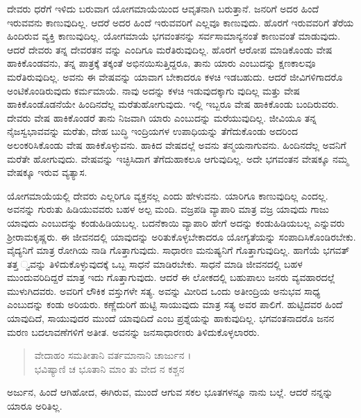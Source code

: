 ದೇವರು ಧರೆಗೆ ಇಳಿದು ಬರುವಾಗ ಯೋಗಮಾಯೆಯಿಂದ ಆವೃತನಾಗಿ ಬರುತ್ತಾನೆ. ಜನರಿಗೆ ಅದರ ಹಿಂದೆ ಇರುವವನು ಕಾಣುವುದಿಲ್ಲ. ಆದರೆ ಅದರ ಹಿಂದೆ ಇರುವವರಿಗೆ ಎಲ್ಲವೂ ಕಾಣುವುದು. ಹೊರಗೆ ಇರುವವರಿಗೆ ತೆರೆಯ ಹಿಂದಿರುವ ವ್ಯಕ್ತಿ ಕಾಣುವುದಿಲ್ಲ. ಯೋಗಮಾಯೆ ಭಗವಂತನನ್ನು ಸರ್ವಸಾಮಾನ್ಯನಂತೆ ಕಾಣುವಂತೆ ಮಾಡುವುದು. ಆದರೆ ದೇವರು ತನ್ನ ದೇವರತನ ವನ್ನು ಎಂದಿಗೂ ಮರೆತಿರುವುದಿಲ್ಲ. ಹೊರಗೆ ಆರೋಪ ಮಾಡಿಕೊಂಡು ವೇಷ ಹಾಕಿಕೊಂಡವನು, ತನ್ನ ಪಾತ್ರಕ್ಕೆ ತಕ್ಕಂತೆ ಅಭಿನಯಿಸುತ್ತಿದ್ದರೂ, ತಾನು ಯಾರು ಎಂಬುದನ್ನು ಕ್ಷಣಕಾಲವೂ ಮರೆತಿರುವುದಿಲ್ಲ. ಅವನು ಈ ವೇಷವನ್ನು ಯಾವಾಗ ಬೇಕಾದರೂ ಕಳಚಿ ಇಡಬಹುದು. ಆದರೆ ಜೀವಿಗಳಿಗಾದರೊ ಅಂಟಿಕೊಂಡಿರುವುದು ಕರ್ಮಮಾಯೆ. ನಾವು ಅದನ್ನು ಕಳಚಿ ಇಡುವುದಕ್ಕಾಗು ವುದಿಲ್ಲ ಮತ್ತು ವೇಷ ಹಾಕಿಕೊಂಡೊಡನೆಯೇ ಹಿಂದಿನದೆಲ್ಲ ಮರೆತುಹೋಗುವುದು. ಇಲ್ಲಿ ಇಬ್ಬರೂ ವೇಷ ಹಾಕಿಕೊಂಡು ಬಂದಿರುವರು. ದೇವರು ವೇಷ ಹಾಕಿಕೊಂಡರೆ ತಾನು ನಿಜವಾಗಿ ಯಾರು ಎಂಬುದನ್ನು ಮರೆಯುವುದಿಲ್ಲ. ಜೀವಿಯೂ ತನ್ನ ನೈಜಸ್ವಭಾವವನ್ನು ಮರೆತು, ದೇಹ ಬುದ್ಧಿ ಇಂದ್ರಿಯಗಳ ಉಪಾಧಿಯನ್ನು ತೆಗೆದುಕೊಂಡು ಅದರಿಂದ ಅಲಂಕರಿಸಿಕೊಂಡು ವೇಷ ಹಾಕಿಕೊಳ್ಳುವನು. ಹಾಕಿದ ವೇಷದಲ್ಲೆ ಅವನು ತನ್ಮಯನಾಗುವನು. ಹಿಂದಿನದೆಲ್ಲ ಅವನಿಗೆ ಮರೆತೇ ಹೋಗುವುದು. ವೇಷವನ್ನು ಇಚ್ಛಿಸಿದಾಗ ತೆಗೆದುಹಾಕಲೂ ಆಗುವುದಿಲ್ಲ. ಅದೇ ಭಗವಂತನ ವೇಷಕ್ಕೂ ನಮ್ಮ ವೇಷಕ್ಕೂ ಇರುವ ವ್ಯತ್ಯಾಸ.

ಯೋಗಮಾಯೆಯಲ್ಲಿ ದೇವರು ಎಲ್ಲರಿಗೂ ವ್ಯಕ್ತನಲ್ಲ ಎಂದು ಹೇಳುವನು. ಯಾರಿಗೂ ಕಾಣುವುದಿಲ್ಲ ಎಂದಲ್ಲ. ಅವನನ್ನು ಗುರುತು ಹಿಡಿಯುವವರು ಬಹಳ ಅಲ್ಪ ಮಂದಿ. ವಜ್ರಪಡಿ ವ್ಯಾಪಾರಿ ಮಾತ್ರ ವಜ್ರ ಯಾವುದು ಗಾಜು ಯಾವುದು ಎಂಬುದನ್ನು ಕಂಡುಹಿಡಿಯಬಲ್ಲ. ಬದನೆಕಾಯಿ ವ್ಯಾಪಾರಿ ಹೇಗೆ ಅದನ್ನು ಕಂಡುಹಿಡಿಯಬಲ್ಲ ಎನ್ನುವರು ಶ್ರೀರಾಮಕೃಷ್ಣರು. ಈ ಜೀವನದಲ್ಲಿ ಯಾವುದನ್ನು ಅರಿತುಕೊಳ್ಳಬೇಕಾದರೂ ಯೋಗ್ಯತೆಯನ್ನು ಸಂಪಾದಿಸಿಕೊಂಡಿರಬೇಕು. ವೈದ್ಯನಿಗೆ ಮಾತ್ರ ರೋಗಿಯ ನಾಡಿ ಗೊತ್ತಾಗುವುದು. ಸಾಧಾರಣ ಮನುಷ್ಯನಿಗೆ ಗೊತ್ತಾಗುವುದಿಲ್ಲ. ಹಾಗೆಯೆ ಭಗವತ್ ತತ್ತ ್ವವನ್ನು ತಿಳಿದುಕೊಳ್ಳುವುದಕ್ಕೆ ಒಬ್ಬ ಸಾಧನೆ ಮಾಡಿರಬೇಕು. ಸಾಧನೆ ಮಾಡಿ ಜೀವನದಲ್ಲಿ ಬಹಳ ಮುಂದುವರಿದಿದ್ದರೆ ಮಾತ್ರ ಇದು ಗೊತ್ತಾಗುವುದು. ಆದರೆ ಈ ಲೋಕದಲ್ಲಿ ಬಹುಪಾಲು ಜನರು ವ್ಯವಹಾರದಲ್ಲೆ ಮುಳುಗಿದವರು. ಅವರಿಗೆ ಲೌಕಿಕ ವಸ್ತುಗಳೇ ಸತ್ಯ. ಅವನ್ನು ಮೀರಿದ ಒಂದು ಅತೀಂದ್ರಿಯ ಅನುಭವ ಸಾಧ್ಯ ಎಂಬುದನ್ನು ಕಂಡು ಅರಿಯರು. ಕಣ್ಣೆದುರಿಗೆ ಹುಟ್ಟಿ ಸಾಯುವುದು ಮಾತ್ರ ಸತ್ಯ ಅವರ ಪಾಲಿಗೆ. ಹುಟ್ಟಿದವರ ಹಿಂದೆ ಯಾವುದಿದೆ, ಸಾಯುವುದರ ಮುಂದೆ ಯಾವುದಿದೆ ಎಂಬ ಪ್ರಶ್ನೆಯನ್ನು ಹಾಕುವುದಿಲ್ಲ. ಭಗವಂತನಾದರೊ ಜನನ ಮರಣ ಬದಲಾವಣೆಗಳಿಗೆ ಅತೀತ. ಅವನನ್ನು ಜನಸಾಧಾರಣರು ತಿಳಿದುಕೊಳ್ಳಲಾರರು.

\begin{verse}
ವೇದಾಹಂ ಸಮತೀತಾನಿ ವರ್ತಮಾನಾನಿ ಚಾರ್ಜುನ ।\\ಭವಿಷ್ಯಾಣಿ ಚ ಭೂತಾನಿ ಮಾಂ ತು ವೇದ ನ ಕಶ್ಚನ 
\end{verse}

{\small ಅರ್ಜುನ, ಹಿಂದೆ ಆಗಿಹೋದ, ಈಗಿರುವ, ಮುಂದೆ ಆಗುವ ಸಕಲ ಭೂತಗಳನ್ನೂ ನಾನು ಬಲ್ಲೆ. ಆದರೆ ನನ್ನನ್ನು ಯಾರೂ ಅರಿತಿಲ್ಲ.}

